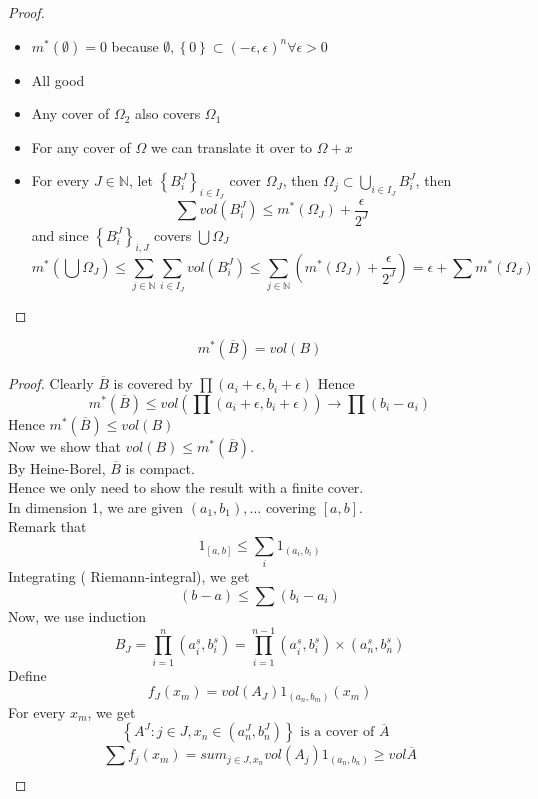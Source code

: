 \documentclass[../main.tex]{subfiles}
\begin{document}
\begin{proof}
	\begin{itemize}
	\item $m^{*}( \emptyset) =0$ because $\emptyset, \left\{ 0 \right\} \subset ( -\epsilon,\epsilon)^{n} \forall \epsilon>0$ 
	\item All good

	\item Any cover of $\Omega_2$ also covers $\Omega_1$ 
	\item For any cover of $\Omega$ we can translate it over to $\Omega+x$ 
	\item For every $J\in \mathbb{N}$, let $\left\{ B_i^{J} \right\}_{i\in I_J}  $ cover $\Omega_J$, then $\Omega_j \subset \bigcup_{i\in I_J} B_i^{J}$, then
		\[ 
		\sum vol( B_i^{J}) \leq m^{*}( \Omega_J) +\frac{\epsilon}{2^{J}}	
		\]
		and since $ \left\{ B_{i}^{J} \right\} _{i,J} $ covers $\bigcup \Omega_J$ 
		\[ 
		m^{*}( \bigcup \Omega_J) \leq \sum_{j\in \mathbb{N}} \sum_{i\in I_J}^{ }vol( B_i^{J}) \leq \sum_{j\in \mathbb{N}}^{ }( m^{*}( \Omega_J) +\frac{\epsilon}{2^{J}}	) = \epsilon+\sum m^{*}( \Omega_J) 	
		\]
		
	\end{itemize}

	
\end{proof}

\begin{propo}
\[ 
m^{*}( \overline{B}) =vol( B) 
\]

\end{propo}
\begin{proof}
Clearly $\overline{B}$ is covered by $\prod ( a_i+\epsilon,b_i+\epsilon) $ 
Hence
\[ 
m^{*}( \overline{B}) \leq vol( \prod( a_i+\epsilon,b_i+\epsilon) ) \to \prod ( b_i-a_i) 
\]
Hence $m^{*}( \overline{B}) \leq vol( B) $ \\
Now we show that $ vol( B) \leq m^{*}( \overline{B}) $.\\
By Heine-Borel, $\overline{B}$ is compact.\\
Hence we only need to show the result with a finite cover.\\
In dimension 1, we are given $( a_1,b_1) ,\ldots$ covering $[a,b]$.\\
Remark that
\[ 
	1_{[a,b]} \leq \sum_i 1_{( a_i,b_i) } 
\]
Integrating ( Riemann-integral), we get
\[ 
	( b-a) \leq \sum ( b_i-a_i) 
\]
Now, we use induction
\[ 
B_J=\prod_{i=1}^{n} ( a_i^{s},b_i^{s}) = \prod_{i=1}^{n-1}( a_i^{s},b_i^{s}) \times ( a_n^{s},b_n^{s}) 
\]
Define
\[ 
f_J( x_m) = vol( A_J) 1_{( a_n,b_m) } ( x_m) 
\]
For every $x_m$, we get
\[ 
	\left\{ A^{J}:j\in J, x_n\in ( a_n^{J},b_n^{J})  \right\} \text{ is a cover of $\overline{A}$  } 
\]
\[ 
	\sum_{}^{ }f_j( x_m) = sum_{j\in J,x_n} vol( A_j) 1_{( a_n,b_n) } \geq vol \overline{A}
\]

\end{proof}




	
\end{document}
